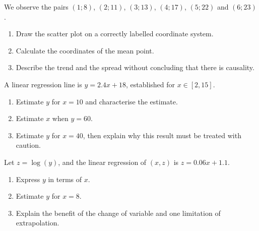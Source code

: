 \begin{exercice}
We observe the pairs $(1;8)$, $(2;11)$, $(3;13)$, $(4;17)$, $(5;22)$ and $(6;23)$.
\begin{enumerate}
\item Draw the scatter plot on a correctly labelled coordinate system.
\item Calculate the coordinates of the mean point.
\item Describe the trend and the spread without concluding that there is causality.
\end{enumerate}
\end{exercice}
\begin{exercice}
A linear regression line is $y=2.4x+18$, established for $x\in[2,15]$.
\begin{enumerate}
\item Estimate $y$ for $x=10$ and characterise the estimate.
\item Estimate $x$ when $y=60$.
\item Estimate $y$ for $x=40$, then explain why this result must be treated with caution.
\end{enumerate}
\end{exercice}
\begin{exercice}
Let $z=\log(y)$, and the linear regression of $(x,z)$ is $z=0.06x+1.1$.
\begin{enumerate}
\item Express $y$ in terms of $x$.
\item Estimate $y$ for $x=8$.
\item Explain the benefit of the change of variable and one limitation of extrapolation.
\end{enumerate}
\end{exercice}

